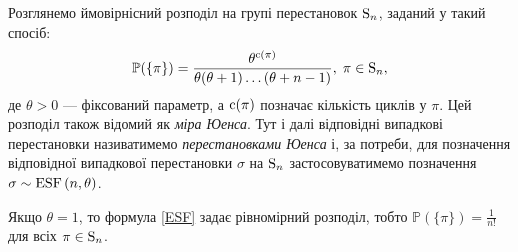 Розглянемо ймовірнісний розподіл на групі перестановок $\mathrm{S}_{n}$, 
заданий у такий спосіб:
\begin{equation}\label{ESF}
    \mathbb{P}(\{\pi\}) = \frac{
        \theta^{\operatorname{c}(\pi)}
    }{
        \theta (\theta + 1) \dots (\theta + n - 1)
    }, \; \pi \in \mathrm{S}_{n},
\end{equation}
де $\theta > 0$ --- фіксований параметр, а $\operatorname{c}(\pi)$ позначає кількість циклів у $\pi$.
Цей розподіл також відомий як
\emph{міра Юенса}. Тут і далі
відповідні випадкові перестановки називатимемо
\emph{перестановками Юенса} і, за потреби, для позначення
відповідної
випадкової перестановки $\sigma$ на $\mathrm{S}_{n}$ застосовуватимемо
позначення $\sigma \sim \mathrm{ESF}\left(n, \theta\right)$.

\begin{remark}
    Якщо $\theta = 1$, то формула \eqref{ESF} задає рівномірний розподіл,
    тобто $\mathbb{P}(\{\pi\}) = \frac{1}{n!}$ для всіх $\pi \in \mathrm{S}_{n}$.
\end{remark}

